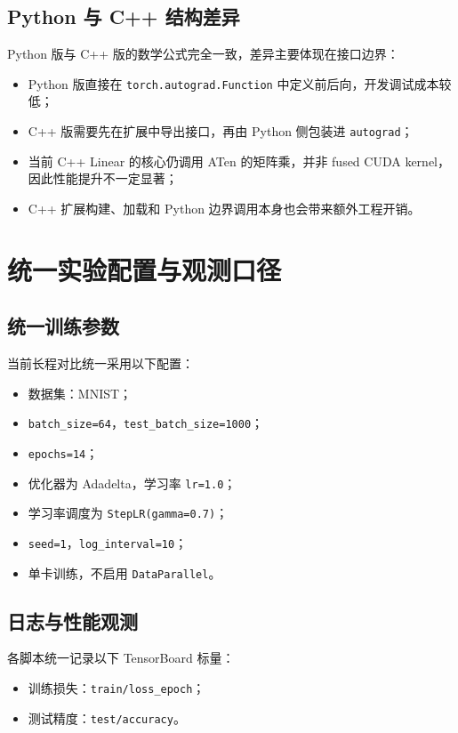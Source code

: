 \documentclass{article}
\begin{document}
\subsection{Python 与 C++ 结构差异}
Python 版与 C++ 版的数学公式完全一致，差异主要体现在接口边界：
\begin{itemize}
    \item Python 版直接在 \texttt{torch.autograd.Function} 中定义前后向，开发调试成本较低；
    \item C++ 版需要先在扩展中导出接口，再由 Python 侧包装进 \texttt{autograd}；
    \item 当前 C++ Linear 的核心仍调用 ATen 的矩阵乘，并非 fused CUDA kernel，因此性能提升不一定显著；
    \item C++ 扩展构建、加载和 Python 边界调用本身也会带来额外工程开销。
\end{itemize}

\section{统一实验配置与观测口径}
\subsection{统一训练参数}
当前长程对比统一采用以下配置：
\begin{itemize}
    \item 数据集：MNIST；
    \item \texttt{batch\_size=64}，\texttt{test\_batch\_size=1000}；
    \item \texttt{epochs=14}；
    \item 优化器为 Adadelta，学习率 \texttt{lr=1.0}；
    \item 学习率调度为 \texttt{StepLR(gamma=0.7)}；
    \item \texttt{seed=1}，\texttt{log\_interval=10}；
    \item 单卡训练，不启用 \texttt{DataParallel}。
\end{itemize}

\subsection{日志与性能观测}
各脚本统一记录以下 TensorBoard 标量：
\begin{itemize}
    \item 训练损失：\texttt{train/loss\_epoch}；
    \item 测试精度：\texttt{test/accuracy}。
\end{itemize}
\end{document}
